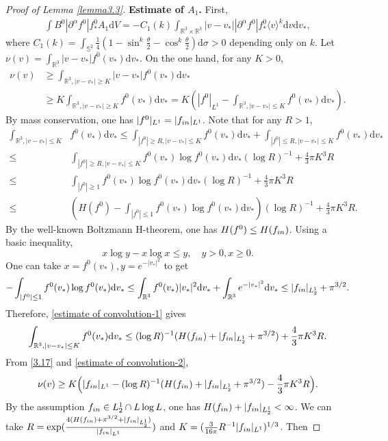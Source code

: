 \documentclass[10pt,a4paper]{amsart}
\def\pa{\partial}
\def\th{\theta}
\let\al=\alpha
\newcommand{\beno}{\begin{eqnarray*}}
\newcommand{\ben}{\begin{eqnarray}}
\newcommand{\beq}{\begin{equation}}
\newcommand{\eeno}{\end{eqnarray*}}
\newcommand{\een}{\end{eqnarray}}
\newcommand{\eeq}{\end{equation}}
\begin{document}
\begin{proof}[Proof of Lemma \ref{lemma3.3}]
  \textbf{Estimate of $A_1$.} First,
    \ben\label{3.16}
    \int B^0|\pa^{\al}f^0|f^0_* A_1 \mathrm{d}V=-C_1(k)\int_{\mathbb{R}^3\times\mathbb{R}^3}|v-v_*||\pa^{\al}f^0|f^0_*\langle v\rangle^{k}\mathrm{d}v\mathrm{d}v_*,
    \een
    where $C_1(k)=\int_{\mathbb{S}^2}\frac{1}{4}(1-\sin^{k}\frac{\th}{2}-\cos^{k}\frac{\th}{2})\mathrm{d}\sigma>0$ depending only on $k$.
 Let
   $\nu(v)=
\int_{\mathbb{R}^3}|v-v_*|f^0(v_*)\mathrm{d}v_*$. On the one hand, for any $K>0$,
\beq\label{3.17}
\begin{aligned}
    \nu(v)&\ge \int_{\mathbb{R}^3,|v-v_*|\ge K}|v-v_*|f^0(v_*)\mathrm{d}v_*\\
    &\ge K\int_{\mathbb{R}^3,|v-v_*|\ge K}f^0(v_*)\mathrm{d}v_*=K(|f^0|_{L^1}-\int_{\mathbb{R}^3,|v-v_*|\le K}f^0(v_*)\mathrm{d}v_*).
\end{aligned}
\eeq
By mass conservation, one has $|f^0|_{L^1}=|f_{\textup{in}}|_{L^1}$. Note that for any $R>1$,
\beq\label{estimate of convolution-1}
\begin{aligned}
\int_{\mathbb{R}^3,|v-v_*|\le K}&f^0(v_*)\mathrm{d}v_*\le \int_{|f^0|\ge R,|v-v_*|\le K}f^0(v_*)\mathrm{d}v_*+\int_{|f^0|\le R,|v-v_*|\le K}f^0(v_*)\mathrm{d}v_*\\
\le & \int_{|f^0|\ge R,|v-v_*|\le K}f^0(v_*)\log f^0(v_*)\mathrm{d}v_* (\log R)^{-1}+ \frac{4}{3}\pi K^3R\\
\le & \int_{|f^0|\ge 1}f^0(v_*)\log f^0(v_*)\mathrm{d}v_* (\log R)^{-1}+ \frac{4}{3}\pi K^3R\\
\le & (H(f^0)-\int_{|f^0|\le 1}f^0(v_*)\log f^0(v_*)\mathrm{d}v_*)(\log R)^{-1}+\frac{4}{3}\pi K^3R.
\end{aligned}
\eeq
By the well-known Boltzmann H-theorem, one has $H(f^0)\le H(f_{\textup{in}})$. Using a basic inequality,
$$x\log y-x\log x\le y,\quad y>0,x\ge 0.$$
One can take $x=f^0(v_*),y=e^{-|v_*|^2}$ to get
$$-\int_{|f^0|\le 1}f^0(v_*)\log f^0(v_*)\mathrm{d}v_*\le \int_{\mathbb{R}^3} f^0(v_*)|v_*|^2\mathrm{d}v_*+\int_{\mathbb{R}^3} e^{-|v_*|^2}\mathrm{d}v_*\le |f_{\textup{in}}|_{L^1_2}+\pi^{3/2}.$$
Therefore, \eqref{estimate of convolution-1} gives
\ben\label{estimate of convolution-2}
\int_{\mathbb{R}^3,|v-v_*|\le K}f^0(v_*)\mathrm{d}v_*\le (\log R)^{-1}(H(f_{\textup{in}})+|f_{\textup{in}}|_{L^1_2}+\pi^{3/2})+\frac{4}{3}\pi K^3R.
\een
From \eqref{3.17} and \eqref{estimate of convolution-2},
\beno
\nu(v)\ge K\Big(|f_{\textup{in}}|_{L^1}-(\log R)^{-1}(H(f_{\textup{in}})+|f_{\textup{in}}|_{L^1_2}+\pi^{3/2})-\frac{4}{3}\pi K^3R\Big).
\eeno
 By the assumption $f_{\textup{in}}\in L^1_{2}\cap L\log L$, one has $H(f_{\textup{in}})+|f_{\textup{in}}|_{L^1_{2}}<\infty$. We can take $R=\exp(\frac{4(H(f_{\textup{in}})+\pi^{3/2}+|f_{\textup{in}}|_{L^1_{2}})}{|f_{\textup{in}}|_{L^1}})$ and $K=(\frac{3}{16\pi}R^{-1}|f_{\textup{in}}|_{L^1})^{1/3}$. Then

\end{proof}
\end{document}
